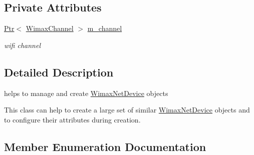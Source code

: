 \subsection*{Private Attributes}
\begin{DoxyCompactItemize}
\item 
\hyperlink{classns3_1_1Ptr}{Ptr}$<$ \hyperlink{classns3_1_1WimaxChannel}{Wimax\+Channel} $>$ \hyperlink{classns3_1_1WimaxHelper_a2d6f863b9fa5d811edd856802ecb0bc3}{m\+\_\+channel}
\begin{DoxyCompactList}\small\item\em wifi channel \end{DoxyCompactList}\end{DoxyCompactItemize}


\subsection{Detailed Description}
helps to manage and create \hyperlink{classns3_1_1WimaxNetDevice}{Wimax\+Net\+Device} objects 

This class can help to create a large set of similar \hyperlink{classns3_1_1WimaxNetDevice}{Wimax\+Net\+Device} objects and to configure their attributes during creation. 

\subsection{Member Enumeration Documentation}
